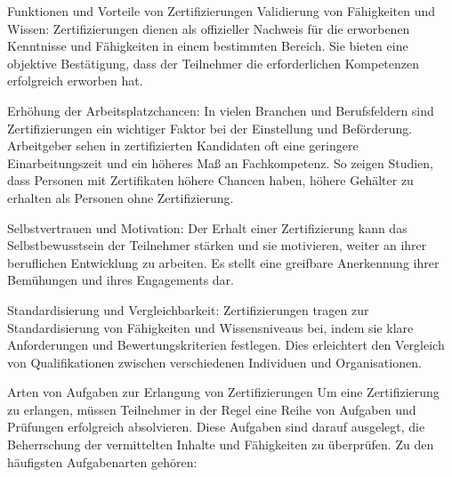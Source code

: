 Funktionen und Vorteile von Zertifizierungen
Validierung von Fähigkeiten und Wissen: Zertifizierungen dienen als offizieller Nachweis für die erworbenen Kenntnisse und Fähigkeiten in einem bestimmten Bereich. Sie bieten eine objektive Bestätigung, dass der Teilnehmer die erforderlichen Kompetenzen erfolgreich erworben hat. %

Erhöhung der Arbeitsplatzchancen: In vielen Branchen und Berufsfeldern sind Zertifizierungen ein wichtiger Faktor bei der Einstellung und Beförderung. Arbeitgeber sehen in zertifizierten Kandidaten oft eine geringere Einarbeitungszeit und ein höheres Maß an Fachkompetenz. So zeigen Studien, dass Personen mit Zertifikaten höhere Chancen haben, höhere Gehälter zu erhalten als Personen ohne Zertifizierung. %

Selbstvertrauen und Motivation: Der Erhalt einer Zertifizierung kann das Selbstbewusstsein der Teilnehmer stärken und sie motivieren, weiter an ihrer beruflichen Entwicklung zu arbeiten. Es stellt eine greifbare Anerkennung ihrer Bemühungen und ihres Engagements dar. %

Standardisierung und Vergleichbarkeit: Zertifizierungen tragen zur Standardisierung von Fähigkeiten und Wissensniveaus bei, indem sie klare Anforderungen und Bewertungskriterien festlegen. Dies erleichtert den Vergleich von Qualifikationen zwischen verschiedenen Individuen und Organisationen.

Arten von Aufgaben zur Erlangung von Zertifizierungen
Um eine Zertifizierung zu erlangen, müssen Teilnehmer in der Regel eine Reihe von Aufgaben und Prüfungen erfolgreich absolvieren. Diese Aufgaben sind darauf ausgelegt, die Beherrschung der vermittelten Inhalte und Fähigkeiten zu überprüfen. Zu den häufigsten Aufgabenarten gehören:

